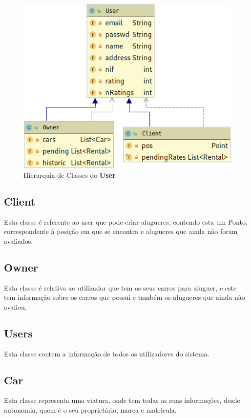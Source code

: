 \documentclass[a4paper]{report}
\begin{document}
\begin{figure}[h]
    \centering
    \includegraphics[scale=0.5]{hierarquiaUser.png}
    \caption{Hierarquia de Classes do \textbf{User}}
\end{figure}

\subsection{Client}

Esta classe é referente ao user que pode criar alugueres, contendo
esta um Ponto, correspondente à posição em que se encontra e alugueres
que ainda não foram avaliados.

\subsection{Owner}

Esta classe é relativa ao utilizador que tem os seus carros para aluguer,
e este tem informação sobre os carros que possui e também os alugueres
que ainda não avaliou.

\subsection{Users}

Esta classe contem a informação de todos os utilizadores do sistema.

\subsection{Car}

Esta classe representa uma viatura, onde tem todas as suas informações,
desde autonomia, quem é o seu proprietário, marca e matricula.
\end{document}
